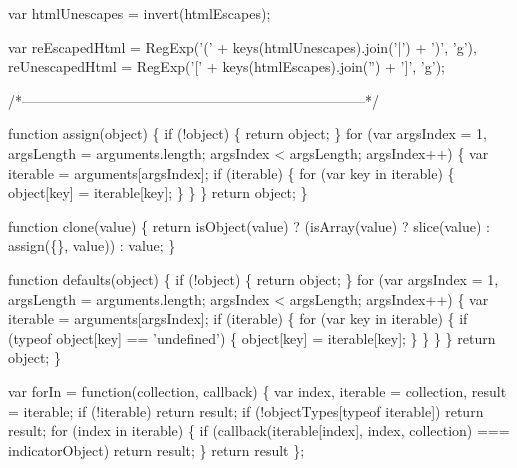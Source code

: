 \begin{DoxyCodeInclude}
{{  var htmlUnescapes = invert(htmlEscapes);

  var reEscapedHtml = RegExp(\textcolor{charliteral}{'('} + keys(htmlUnescapes).join(\textcolor{charliteral}{'|'}) + \textcolor{charliteral}{')'}, \textcolor{charliteral}{'g'}),
      reUnescapedHtml = RegExp(\textcolor{charliteral}{'['} + keys(htmlEscapes).join(\textcolor{stringliteral}{''}) + \textcolor{charliteral}{']'}, \textcolor{charliteral}{'g'});

  \textcolor{comment}{/*--------------------------------------------------------------------------*/}

  \textcolor{keyword}{function} assign(\textcolor{keywordtype}{object}) \{
    \textcolor{keywordflow}{if} (!\textcolor{keywordtype}{object}) \{
      \textcolor{keywordflow}{return} object;
    \}
    \textcolor{keywordflow}{for} (var argsIndex = 1, argsLength = arguments.length; argsIndex < argsLength; argsIndex++) \{
      var iterable = arguments[argsIndex];
      \textcolor{keywordflow}{if} (iterable) \{
        \textcolor{keywordflow}{for} (var key in iterable) \{
          \textcolor{keywordtype}{object}[key] = iterable[key];
        \}
      \}
    \}
    \textcolor{keywordflow}{return} object;
  \}

  \textcolor{keyword}{function} clone(value) \{
    \textcolor{keywordflow}{return} isObject(value)
      ? (isArray(value) ? slice(value) : assign(\{\}, value))
      : value;
  \}

  \textcolor{keyword}{function} defaults(\textcolor{keywordtype}{object}) \{
    \textcolor{keywordflow}{if} (!\textcolor{keywordtype}{object}) \{
      \textcolor{keywordflow}{return} object;
    \}
    \textcolor{keywordflow}{for} (var argsIndex = 1, argsLength = arguments.length; argsIndex < argsLength; argsIndex++) \{
      var iterable = arguments[argsIndex];
      \textcolor{keywordflow}{if} (iterable) \{
        \textcolor{keywordflow}{for} (var key in iterable) \{
          \textcolor{keywordflow}{if} (typeof \textcolor{keywordtype}{object}[key] == \textcolor{stringliteral}{'undefined'}) \{
            \textcolor{keywordtype}{object}[key] = iterable[key];
          \}
        \}
      \}
    \}
    \textcolor{keywordflow}{return} object;
  \}

  var forIn = \textcolor{keyword}{function}(collection, callback) \{
    var index, iterable = collection, result = iterable;
    \textcolor{keywordflow}{if} (!iterable) \textcolor{keywordflow}{return} result;
    \textcolor{keywordflow}{if} (!objectTypes[typeof iterable]) \textcolor{keywordflow}{return} result;
      \textcolor{keywordflow}{for} (index in iterable) \{
        \textcolor{keywordflow}{if} (callback(iterable[index], index, collection) === indicatorObject) \textcolor{keywordflow}{return} result;
      \}
    \textcolor{keywordflow}{return} result
  \};

}}
\end{DoxyCodeInclude}
